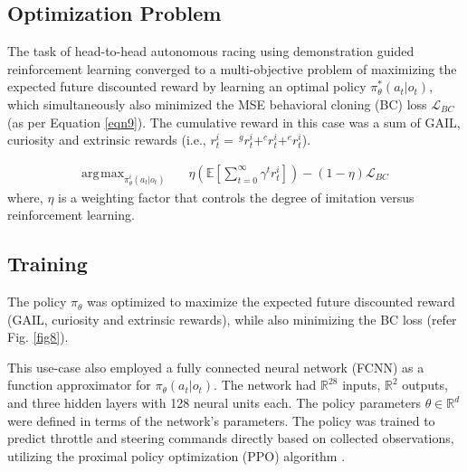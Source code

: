 \documentclass[letterpaper, 10 pt, conference]{ieeeconf}  %
\DeclareMathOperator*{\argmax}{\arg\!\max} %
\begin{document}
	\subsection{Optimization Problem}
	\label{Sub-Section: Optimization Problem II}
	
	The task of head-to-head autonomous racing using demonstration guided reinforcement learning converged to a multi-objective problem of maximizing the expected future discounted reward by learning an optimal policy $\pi^*_\theta \left(a_t|o_t\right)$, which simultaneously also minimized the MSE behavioral cloning (BC) loss $\mathcal{L}_{BC}$ (as per Equation \ref{eqn9}). The cumulative reward in this case was a sum of GAIL, curiosity and extrinsic rewards (i.e., $r^i_t =\, ^{g}r^i_t + ^{c}r^i_t + ^{e}r^i_t$).
	
	\begin{align}
	\label{eqn9}
	\argmax_{\pi^i_\theta \left(a_t|o_t\right)} \quad & \eta \left(\mathbb{E}\left [ \sum_{t=0}^{\infty} \gamma^t r^i_t \right ] \right) - (1-\eta) \mathcal{L}_{BC}
	\end{align}
	where, $\eta$ is a weighting factor that controls the degree of imitation versus reinforcement learning.
	
	\subsection{Training}
	\label{Sub-Section: Training II}
	
	The policy $\pi_\theta$ was optimized to maximize the expected future discounted reward (GAIL, curiosity and extrinsic rewards), while also minimizing the BC loss (refer Fig. \ref{fig8}).
	
	This use-case also employed a fully connected neural network (FCNN) as a function approximator for $\pi_\theta \left ( a_t | o_t \right )$. The network had $\mathbb{R}^{28}$ inputs, $\mathbb{R}^{2}$ outputs, and three hidden layers with 128 neural units each. The policy parameters $\theta \in \mathbb{R}^d$ were defined in terms of the network's parameters. The policy was trained to predict throttle and steering commands directly based on collected observations, utilizing the proximal policy optimization (PPO) algorithm \cite{PPO2017}.
	
\end{document}
